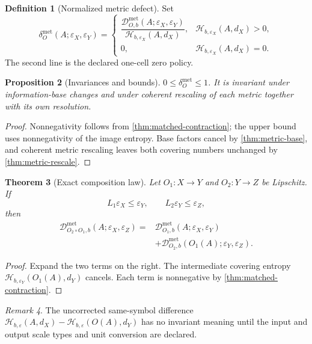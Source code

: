 \documentclass[11pt,a4paper]{article}
\theoremstyle{definition}
\newtheorem{definition}{Definition}[section]
\theoremstyle{plain}
\newtheorem{theorem}[definition]{Theorem}
\newtheorem{proposition}[definition]{Proposition}
\theoremstyle{remark}
\newtheorem{remark}[definition]{Remark}
\newcommand{\Hmet}{\mathscr{H}}
\newcommand{\Dmet}{\mathscr{D}^{\mathrm{met}}}
\newcommand{\dmet}{\delta^{\mathrm{met}}}
\begin{document}
\begin{definition}[Normalized metric defect]
\label{def:normalized-metric-defect}
Set
\[
\dmet_O(A;\varepsilon_X,\varepsilon_Y)
=
\begin{cases}
\dfrac{\Dmet_{O,b}(A;\varepsilon_X,\varepsilon_Y)}
{\Hmet_{b,\varepsilon_X}(A,d_X)},
&
\Hmet_{b,\varepsilon_X}(A,d_X)>0,\\[1.2ex]
0,&
\Hmet_{b,\varepsilon_X}(A,d_X)=0.
\end{cases}
\]
The second line is the declared one-cell zero policy.
\end{definition}

\begin{proposition}[Invariances and bounds]
\label{prop:metric-defect-invariance}
$0\leq\dmet_O\leq1$. It is invariant under information-base changes and
under coherent rescaling of each metric together with its own resolution.
\end{proposition}

\begin{proof}
Nonnegativity follows from \cref{thm:matched-contraction}; the upper bound
uses nonnegativity of the image entropy. Base factors cancel by
\cref{thm:metric-base}, and coherent metric rescaling leaves both covering
numbers unchanged by \cref{thm:metric-rescale}.
\end{proof}

\begin{theorem}[Exact composition law]
\label{thm:defect-composition}
Let $O_1:X\to Y$ and $O_2:Y\to Z$ be Lipschitz. If
\[
L_1\varepsilon_X\leq\varepsilon_Y,
\qquad
L_2\varepsilon_Y\leq\varepsilon_Z,
\]
then
\begin{align*}
\Dmet_{O_2\circ O_1,b}
(A;\varepsilon_X,\varepsilon_Z)
={}&
\Dmet_{O_1,b}
(A;\varepsilon_X,\varepsilon_Y)\\
&+
\Dmet_{O_2,b}
(O_1(A);\varepsilon_Y,\varepsilon_Z).
\end{align*}
\end{theorem}

\begin{proof}
Expand the two terms on the right. The intermediate covering entropy
$\Hmet_{b,\varepsilon_Y}(O_1(A),d_Y)$ cancels. Each term is nonnegative by
\cref{thm:matched-contraction}.
\end{proof}

\begin{remark}
The uncorrected same-symbol difference
$\Hmet_{b,\varepsilon}(A,d_X)
-\Hmet_{b,\varepsilon}(O(A),d_Y)$
has no invariant meaning until the input and output scale types and unit
conversion are declared.
\end{remark}
\end{document}
